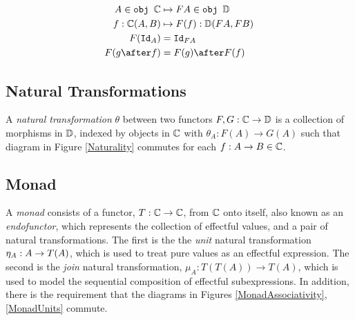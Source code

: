 \begin{align*}
    A\in\obj\C &\mapsto FA \in \obj\DC\\
    f: \C(A, B) &\mapsto F(f): \DC(FA, FB)\\
    F(\Id{A}) & = \Id{FA} \\
    F(g\after f) & = F(g)\after F(f)
\end{align*}

\subsection{Natural Transformations}

A \textit{natural transformation} $\theta$ between two functors $F, G: \mathbb{C} \rightarrow \mathbb{D}$ is a collection of morphisms in $\mathbb{D}$, indexed by objects in $\mathbb{C}$ with  $\theta_A: F(A) \rightarrow G(A)$ such that diagram in Figure \ref{Naturality} commutes for each $f: A \rightarrow B \in \mathbb{C}$.



\subsection{Monad}
A \textit{monad} consists of a functor, $T: \mathbb{C} \rightarrow \mathbb{C}$, from $\mathbb{C}$ onto itself, also known as an \textit{endofunctor}, which represents the collection of effectful values, and a pair of natural transformations. The first is the the \textit{unit} natural transformation $\eta_{A}: A\rightarrow T(A)$, which is used to treat pure values as an effectful expression. The second is the \textit{join} natural transformation, $\mu_{A}: T(T(A)) \rightarrow T(A)$,  which is used to model the sequential composition of effectful subexpressions. In addition, there is the requirement that the diagrams in Figures \ref{MonadAssociativity}, \ref{MonadUnits} commute.


